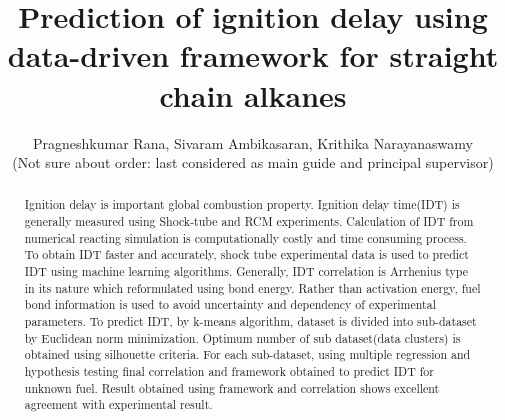 \documentclass[preprint,12pt]{elsarticle}
\begin{document}
	
	\begin{frontmatter}
		
		
		\title{Prediction of ignition delay using data-driven framework for straight chain alkanes}
		
		
		
		
		\author{Pragneshkumar Rana, Sivaram Ambikasaran, Krithika Narayanaswamy \\ 
			(Not sure about order: last considered  as main guide and principal supervisor) }
		
		\address{Indian Institute of Technology, Madras}
		
		\begin{abstract}
		 Ignition delay is important global combustion property. Ignition delay time(IDT) is generally measured using Shock-tube and RCM experiments. Calculation of IDT from numerical reacting simulation is computationally costly and time consuming process. To obtain IDT faster and accurately, shock tube experimental data is used to predict IDT using machine learning algorithms. Generally, IDT correlation is Arrhenius type in its nature which reformulated using bond energy. Rather than activation energy, fuel bond information is used to avoid uncertainty and dependency of experimental parameters. To predict IDT, by k-means algorithm, dataset is divided into sub-dataset by Euclidean norm minimization. Optimum number of sub dataset(data clusters) is obtained using  silhouette criteria. For each sub-dataset, using multiple regression and hypothesis testing final correlation and framework obtained to predict IDT for unknown fuel. Result obtained  using framework and correlation shows excellent agreement with experimental result.  
		\end{abstract}
		

\end{frontmatter}
\end{document}
